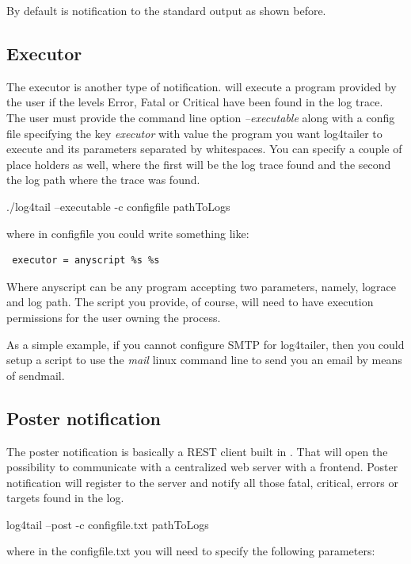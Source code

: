 \noindent
By default is notification to the standard output as shown before. 

\subsection{Executor}
\label{sec:executor}

The executor is another type of notification. \logftailer{} will execute a
program provided by the user if the levels Error, Fatal or Critical have been
found in the log trace. The user must provide the command line option
\emph{--executable} along with a config file specifying the key \emph{executor}
with value the program you want log4tailer to execute and its parameters
separated by whitespaces. You can specify a couple of place holders as well,
where the first will be the log trace found and the second the log path where
the trace was found.

\begin{cmd}
 ./log4tail --executable -c configfile pathToLogs
\end{cmd}

where in configfile you could write something like:

\begin{verbatim}
 executor = anyscript %s %s 
\end{verbatim}

Where anyscript can be any program accepting two parameters, namely, lograce and log path. The script 
you provide, of course, will need to have execution permissions for the user 
owning the \logftailer{} process. 

As a simple example, if you cannot configure SMTP for log4tailer, then you could 
setup a script to use the \emph{mail} linux command line to send you an email by means of sendmail.

\subsection{Poster notification}
\label{sec:poster}
The poster notification is basically a REST client built in \logftailer{}. That will open 
the possibility to communicate with a centralized web server with a frontend. Poster 
notification will register to the server and notify all those fatal, critical, errors or 
targets found in the log. 
\begin{cmd}
 log4tail --post -c configfile.txt pathToLogs
\end{cmd}
where in the configfile.txt you will need to specify the following parameters:

